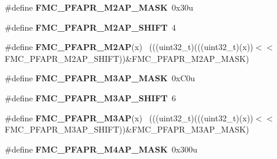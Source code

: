 \begin{DoxyCompactItemize}
\item 
\hypertarget{group___f_m_c___register___masks_gab3e23f648e34da06b351ac745476f30c}{}\#define {\bfseries F\+M\+C\+\_\+\+P\+F\+A\+P\+R\+\_\+\+M2\+A\+P\+\_\+\+M\+A\+S\+K}~0x30u\label{group___f_m_c___register___masks_gab3e23f648e34da06b351ac745476f30c}

\item 
\hypertarget{group___f_m_c___register___masks_ga05f65455021f093de56e9e086f7185ee}{}\#define {\bfseries F\+M\+C\+\_\+\+P\+F\+A\+P\+R\+\_\+\+M2\+A\+P\+\_\+\+S\+H\+I\+F\+T}~4\label{group___f_m_c___register___masks_ga05f65455021f093de56e9e086f7185ee}

\item 
\hypertarget{group___f_m_c___register___masks_ga601ae7a66d0d789ff410c2ad8993a9e6}{}\#define {\bfseries F\+M\+C\+\_\+\+P\+F\+A\+P\+R\+\_\+\+M2\+A\+P}(x)                                            ~(((uint32\+\_\+t)(((uint32\+\_\+t)(x))$<$$<$F\+M\+C\+\_\+\+P\+F\+A\+P\+R\+\_\+\+M2\+A\+P\+\_\+\+S\+H\+I\+F\+T))\&F\+M\+C\+\_\+\+P\+F\+A\+P\+R\+\_\+\+M2\+A\+P\+\_\+\+M\+A\+S\+K)\label{group___f_m_c___register___masks_ga601ae7a66d0d789ff410c2ad8993a9e6}

\item 
\hypertarget{group___f_m_c___register___masks_gae2347dc5794bb1de5793cd2a1c31854f}{}\#define {\bfseries F\+M\+C\+\_\+\+P\+F\+A\+P\+R\+\_\+\+M3\+A\+P\+\_\+\+M\+A\+S\+K}~0x\+C0u\label{group___f_m_c___register___masks_gae2347dc5794bb1de5793cd2a1c31854f}

\item 
\hypertarget{group___f_m_c___register___masks_gacb37659011a95dffc2216ccedfafb212}{}\#define {\bfseries F\+M\+C\+\_\+\+P\+F\+A\+P\+R\+\_\+\+M3\+A\+P\+\_\+\+S\+H\+I\+F\+T}~6\label{group___f_m_c___register___masks_gacb37659011a95dffc2216ccedfafb212}

\item 
\hypertarget{group___f_m_c___register___masks_ga7f6be124f97a870ea97c73ff56f1ffbf}{}\#define {\bfseries F\+M\+C\+\_\+\+P\+F\+A\+P\+R\+\_\+\+M3\+A\+P}(x)                                            ~(((uint32\+\_\+t)(((uint32\+\_\+t)(x))$<$$<$F\+M\+C\+\_\+\+P\+F\+A\+P\+R\+\_\+\+M3\+A\+P\+\_\+\+S\+H\+I\+F\+T))\&F\+M\+C\+\_\+\+P\+F\+A\+P\+R\+\_\+\+M3\+A\+P\+\_\+\+M\+A\+S\+K)\label{group___f_m_c___register___masks_ga7f6be124f97a870ea97c73ff56f1ffbf}

\item 
\hypertarget{group___f_m_c___register___masks_ga7a4045976082b3e527eddd6a51204aaa}{}\#define {\bfseries F\+M\+C\+\_\+\+P\+F\+A\+P\+R\+\_\+\+M4\+A\+P\+\_\+\+M\+A\+S\+K}~0x300u\label{group___f_m_c___register___masks_ga7a4045976082b3e527eddd6a51204aaa}


\end{DoxyCompactItemize}
